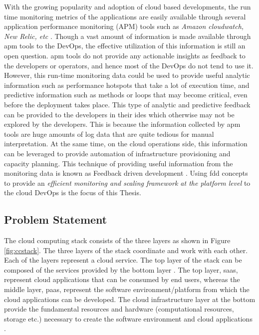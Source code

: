 \documentclass[article,type=msc,colorback,12pt,accentcolor=tud8b,table]{tudthesis}
\begin{document}
	\par With the growing popularity and adoption of cloud based developments, the run time monitoring metrics of the applications are easily available through several application performance monitoring (APM) tools such as \textit{Amazon cloudwatch, New Relic, etc} \cite{cloudwatch, newrelic}.  Though a vast amount of information is made available through \gls{apm} tools to the DevOps, the effective utilization of this information is still an open question. \gls{apm} tools do not provide any actionable insights as feedback to the developers or operators, and hence most of the DevOps do not tend to use it. However, this run-time monitoring data could be used to provide useful analytic information such as performance hotspots that take a lot of execution time, and predictive information such as methods or loops that may become critical, even before the deployment takes place. This type of analytic and predictive feedback can be provided to the developers in their \gls{ide}s which otherwise may not be explored by the developers. This is because the information collected by \gls{apm} tools are huge amounts of log data that are quite tedious for manual interpretation. At the same time, on the cloud operations side, this information can be leveraged to provide automation of infrastructure provisioning and capacity planning. This technique of providing useful information from the monitoring data is known as Feedback driven development \cite{cito2015runtime}. Using \gls{fdd} concepts to provide an \textit{efficient monitoring and scaling framework at the platform level} to the cloud DevOps is the focus of this Thesis.	
	
	\subsection{Problem Statement}	
	
The cloud computing stack consists of the three layers as shown in Figure \ref{fig:ccstack}. The three layers of the stack coordinate and work with each other. Each of the layers represent a cloud service. The top layer of the stack can be composed of the services provided by the bottom layer \cite{youseff2008toward}. The top layer, \gls{saas}, represent cloud applications that can be consumed by end users, whereas the middle layer, \gls{paas}, represent the software environment/platform from which the cloud applications can be developed. The cloud infrastructure layer at the bottom provide the fundamental resources and hardware (computational resources, storage etc.) necessary to create the software environment and cloud applications \cite{youseff2008toward}.  
\end{document}
